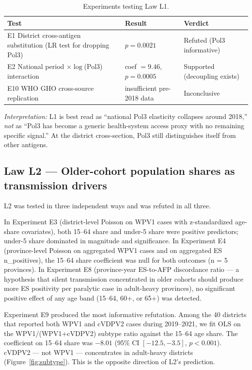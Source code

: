 \documentclass[11pt]{article}
\begin{document}
\begin{table}[h]
\centering
\small
\begin{tabular}{lll}
\toprule
Test & Result & Verdict \\
\midrule
E1 District cross-antigen substitution (LR test for dropping Pol3) & $p{=}0.0021$ & Refuted (Pol3 informative) \\
E2 National period $\times \log$(Pol3) interaction & coef $=9.46$, $p{=}0.0005$ & Supported (decoupling exists) \\
E10 WHO GHO cross-source replication & insufficient pre-2018 data & Inconclusive \\
\bottomrule
\end{tabular}
\caption{Experiments testing Law L1.}
\end{table}

\textit{Interpretation:} L1 is best read as ``national Pol3 elasticity collapses around 2018,'' \emph{not} as ``Pol3 has become a generic health-system access proxy with no remaining specific signal.'' At the district cross-section, Pol3 still distinguishes itself from other antigens.

\subsection{Law L2 --- Older-cohort population shares as transmission drivers}

L2 was tested in three independent ways and was refuted in all three.

In Experiment E3 (district-level Poisson on WPV1 cases with z-standardized age-share covariates), both 15--64 share and under-5 share were positive predictors; under-5 share dominated in magnitude and significance. In Experiment E4 (province-level Poisson on aggregated WPV1 cases and on aggregated ES n\_positives), the 15--64 share coefficient was null for both outcomes (n = 5 provinces). In Experiment E8 (province-year ES-to-AFP discordance ratio --- a hypothesis that silent transmission concentrated in older cohorts should produce more ES positivity per paralytic case in adult-heavy provinces), no significant positive effect of any age band (15--64, 60+, or 65+) was detected.

Experiment E9 produced the most informative refutation. Among the 40 districts that reported both WPV1 and cVDPV2 cases during 2019--2021, we fit OLS on the WPV1/(WPV1+cVDPV2) subtype ratio against the 15--64 age share. The coefficient on 15--64 share was $-8.01$ (95\% CI $[-12.5, -3.5]$, $p<0.001$). cVDPV2 --- not WPV1 --- concentrates in adult-heavy districts (Figure~\ref{fig:subtype}). This is the opposite direction of L2's prediction.
\end{document}
